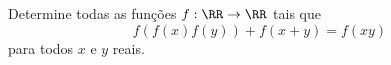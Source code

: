 Determine todas as funções $f: \RR \rightarrow \RR$ tais que
\[ f(f(x)f(y)) + f(x+y) = f(xy) \]
para todos $x$ e $y$ reais.
